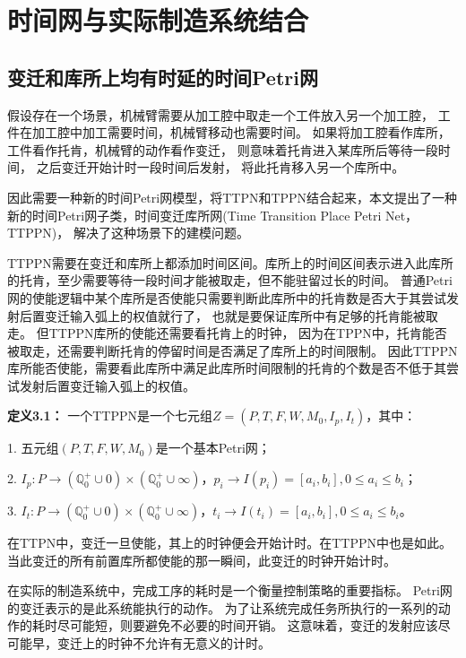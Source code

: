 \chapter{时间网与实际制造系统结合}

\section{变迁和库所上均有时延的时间Petri网}
假设存在一个场景，机械臂需要从加工腔中取走一个工件放入另一个加工腔，
工件在加工腔中加工需要时间，机械臂移动也需要时间。
如果将加工腔看作库所，工件看作托肯，机械臂的动作看作变迁，
则意味着托肯进入某库所后等待一段时间，
之后变迁开始计时一段时间后发射，
将此托肯移入另一个库所中。

因此需要一种新的时间Petri网模型，将TTPN和TPPN结合起来，本文提出了一种新的时间Petri网子类，时间变迁库所网(Time Transition Place Petri Net，TTPPN)，
解决了这种场景下的建模问题。

TTPPN需要在变迁和库所上都添加时间区间。库所上的时间区间表示进入此库所的托肯，至少需要等待一段时间才能被取走，但不能驻留过长的时间。
普通Petri网的使能逻辑中某个库所是否使能只需要判断此库所中的托肯数是否大于其尝试发射后置变迁输入弧上的权值就行了，
也就是要保证库所中有足够的托肯能被取走。
但TTPPN库所的使能还需要看托肯上的时钟，
因为在TPPN中，托肯能否被取走，还需要判断托肯的停留时间是否满足了库所上的时间限制。
因此TTPPN库所能否使能，需要看此库所中满足此库所时间限制的托肯的个数是否不低于其尝试发射后置变迁输入弧上的权值。

\textbf{定义3.1}\textbf{：}
一个TTPPN是一个七元组$Z=(P,T,F,W,M_{0},I_{p},I_{t})$，其中：

1. 五元组$(P,T,F,W,M_{0})$是一个基本Petri网；

2. $I_{p}:P \rightarrow (\mathbb{Q}_{0}^{+} \cup 0) \times (\mathbb{Q}_{0}^{+} \cup {\infty})$，$p_{i} \rightarrow I(p_{i})=[a_{i},b_{i}], 0 \leq a_{i} \leq b_{i} $；

3. $I_{t}:P \rightarrow (\mathbb{Q}_{0}^{+} \cup 0) \times (\mathbb{Q}_{0}^{+} \cup {\infty})$，$t_{i} \rightarrow I(t_{i})=[a_{i},b_{i}], 0 \leq a_{i} \leq b_{i} $。

在TTPN中，变迁一旦使能，其上的时钟便会开始计时。在TTPPN中也是如此。
当此变迁的所有前置库所都使能的那一瞬间，此变迁的时钟开始计时。

在实际的制造系统中，完成工序的耗时是一个衡量控制策略的重要指标。
Petri网的变迁表示的是此系统能执行的动作。
为了让系统完成任务所执行的一系列的动作的耗时尽可能短，则要避免不必要的时间开销。
这意味着，变迁的发射应该尽可能早，变迁上的时钟不允许有无意义的计时。

